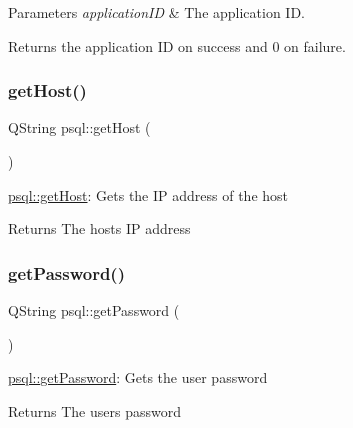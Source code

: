 \begin{DoxyParams}{Parameters}
{\em application\+ID} & The application ID. \\
\hline
\end{DoxyParams}
\begin{DoxyReturn}{Returns}
the application ID on success and 0 on failure. 
\end{DoxyReturn}
\mbox{\label{classpsql_a95d06ee661db0b9cf72605b983b04613}} 
\subsubsection{\texorpdfstring{get\+Host()}{getHost()}}
{\footnotesize\ttfamily Q\+String psql\+::get\+Host (\begin{DoxyParamCaption}{ }\end{DoxyParamCaption})}



\hyperlink{classpsql_a95d06ee661db0b9cf72605b983b04613}{psql\+::get\+Host}\+: Gets the IP address of the host 

\begin{DoxyReturn}{Returns}
The host\textquotesingle{}s IP address 
\end{DoxyReturn}
\mbox{\label{classpsql_a817e5a88f877cac6f843c1e743aec096}} 
\subsubsection{\texorpdfstring{get\+Password()}{getPassword()}}
{\footnotesize\ttfamily Q\+String psql\+::get\+Password (\begin{DoxyParamCaption}{ }\end{DoxyParamCaption})}



\hyperlink{classpsql_a817e5a88f877cac6f843c1e743aec096}{psql\+::get\+Password}\+: Gets the user password 

\begin{DoxyReturn}{Returns}
The user\textquotesingle{}s password 
\end{DoxyReturn}
\mbox{\label{classpsql_ae262aec447273444deeda34113361e21}} 

